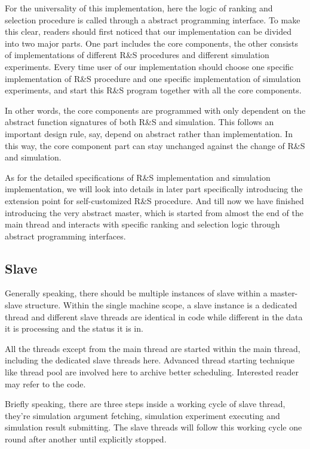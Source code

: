 \documentclass[12pt,a4paper]{report}
\begin{document}
For the universality of this implementation, here the logic of ranking and selection procedure is called through a abstract programming interface. To make this clear, readers should first noticed that our implementation can be divided into two major parts. One part includes the core components, the other consists of implementations of different R\&S procedures and different simulation experiments. Every time user of our implementation should choose one specific implementation of R\&S procedure and one specific implementation of simulation experiments, and start this R\&S program together with all the core components.

In other words, the core components are programmed with only dependent on the abstract function signatures of both R\&S and simulation. This follows an important design rule, say, depend on abstract rather than implementation. In this way, the core component part can stay unchanged against the change of R\&S and simulation.

As for the detailed specifications of R\&S implementation and simulation implementation, we will look into details in later part specifically introducing the extension point for self-customized R\&S procedure. And till now we have finished introducing the very abstract master, which is started from almost the end of the main thread and interacts with specific ranking and selection logic through abstract programming interfaces.

\subsection{Slave}

Generally speaking, there should be multiple instances of slave within a master-slave structure. Within the single machine scope, a slave instance is a dedicated thread and different slave threads are identical in code while different in the data it is processing and the status it is in.

All the threads except from the main thread are started within the main thread, including the dedicated slave threads here. Advanced thread starting technique like thread pool are involved here to archive better scheduling. Interested reader may refer to the code.

Briefly speaking, there are three steps inside a working cycle of slave thread, they're simulation argument fetching, simulation experiment executing and simulation result submitting. The slave threads will follow this working cycle one round after another until explicitly stopped.
\end{document}
